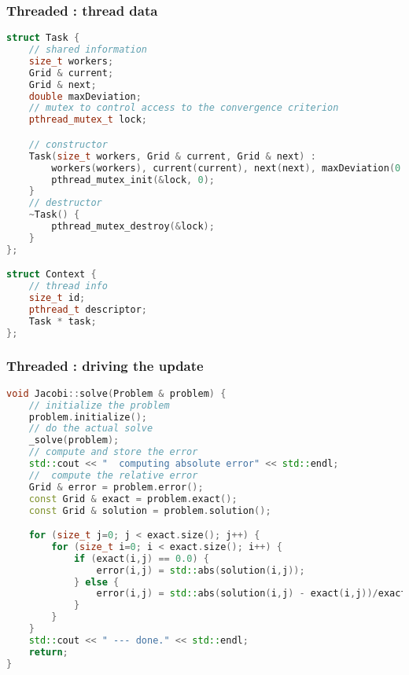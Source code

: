 \begin{frame}[fragile]
% 
  \frametitle{Threaded : thread data}
%
  \begin{lstlisting}[language=c++,name=Jacobi:threaded]
struct Task {
    // shared information 
    size_t workers;
    Grid & current;
    Grid & next;
    double maxDeviation;
    // mutex to control access to the convergence criterion
    pthread_mutex_t lock; 

    // constructor
    Task(size_t workers, Grid & current, Grid & next) :
        workers(workers), current(current), next(next), maxDeviation(0.0) {
        pthread_mutex_init(&lock, 0);
    }
    // destructor
    ~Task() {
        pthread_mutex_destroy(&lock);
    }
};

struct Context {
    // thread info
    size_t id;
    pthread_t descriptor;
    Task * task;
};

  \end{lstlisting}
%
\end{frame}

\begin{frame}[fragile]
% 
  \frametitle{Threaded : driving the update}
%
  \begin{lstlisting}[language=c++,name=Jacobi:threaded]
void Jacobi::solve(Problem & problem) {
    // initialize the problem
    problem.initialize();
    // do the actual solve
    _solve(problem);
    // compute and store the error
    std::cout << "  computing absolute error" << std::endl;
    //  compute the relative error
    Grid & error = problem.error();
    const Grid & exact = problem.exact();
    const Grid & solution = problem.solution();

    for (size_t j=0; j < exact.size(); j++) {
        for (size_t i=0; i < exact.size(); i++) {
            if (exact(i,j) == 0.0) {
                error(i,j) = std::abs(solution(i,j));
            } else {
                error(i,j) = std::abs(solution(i,j) - exact(i,j))/exact(i,j);
            }
        }
    }
    std::cout << " --- done." << std::endl;
    return;
}
  \end{lstlisting}
%
\end{frame}


